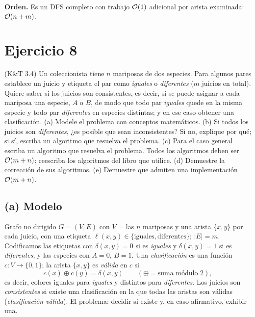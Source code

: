 \textbf{Orden.} Es un DFS completo con trabajo $\mathcal{O}(1)$ adicional por arista examinada: $\mathcal{O}(n+m)$.

\section{Ejercicio 8}
\begin{enunciado}
(K\&T 3.4) Un coleccionista tiene $n$ mariposas de dos especies. Para algunos pares establece un juicio
y etiqueta el par como \emph{iguales} o \emph{diferentes} ($m$ juicios en total). Quiere saber si los
juicios son consistentes, es decir, si se puede asignar a cada mariposa una especie, $A$ o $B$, de
modo que todo par \emph{iguales} quede en la misma especie y todo par \emph{diferentes} en especies
distintas; y en ese caso obtener una clasificación.
(a) Modele el problema con conceptos matemáticos.
(b) Si todos los juicios son \emph{diferentes}, ¿es posible que sean inconsistentes? Si no, explique por
qué; si sí, escriba un algoritmo que resuelva el problema.
(c) Para el caso general escriba un algoritmo que resuelva el problema.
Todos los algoritmos deben ser $\mathcal{O}(m+n)$; reescriba los algoritmos del libro que utilice.
(d) Demuestre la corrección de sus algoritmos.
(e) Demuestre que admiten una implementación $\mathcal{O}(m+n)$.
\end{enunciado}

\subsection*{(a) Modelo}
Grafo no dirigido $G=(V,E)$ con $V$ = las $n$ mariposas y una arista $\{x,y\}$ por cada juicio, con una
etiqueta $\ell(x,y)\in\{\text{iguales},\text{diferentes}\}$; $|E|=m$. Codificamos las etiquetas con
$\delta(x,y)=0$ si es \emph{iguales} y $\delta(x,y)=1$ si es \emph{diferentes}, y las especies con
$A=0$, $B=1$. Una \emph{clasificación} es una función $c:V\to\{0,1\}$; la arista $\{x,y\}$ es
\emph{válida} en $c$ si
\[ c(x)\oplus c(y)=\delta(x,y)\qquad(\oplus=\text{suma módulo 2}), \]
es decir, colores iguales para \emph{iguales} y distintos para \emph{diferentes}. Los juicios son
\emph{consistentes} si existe una clasificación en la que todas las aristas son válidas
(\emph{clasificación válida}). El problema: decidir si existe y, en caso afirmativo, exhibir una.

